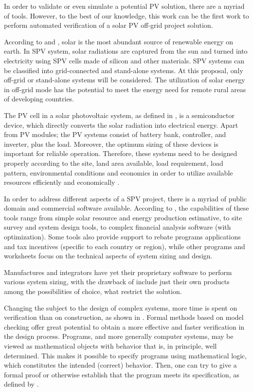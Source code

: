 \documentclass[journal]{IEEEtran}
\begin{document}
In order to validate or even simulate a potential PV solution, there are a myriad of tools. However, to the best of our knowledge, this work can be the first work to perform automated verification of a solar PV off-grid project solution.  

According to \cite{SEIA} and \cite{Chauhan}, solar is the most abundant source of renewable energy on earth. In SPV system, solar radiations are captured from the sun and turned into electricity using SPV cells made of silicon and other materials. SPV systems can be classified into grid-connected and stand-alone systems. At this proposal, only off-grid or stand-alone systems will be considered. The utilization of solar energy in off-grid mode has the potential to meet the energy need for remote rural areas of developing countries.  

The PV cell in a solar photovoltaic system, as defined in \cite{Rawat}, is a semiconductor device, which directly converts the solar radiation into electrical energy. Apart from PV modules; the PV systems consist of battery bank, controller, and inverter, plus the load. Moreover, the optimum sizing of these devices is important for reliable operation. Therefore, these systems need to be designed properly according to the site, land area available, load requirement, load pattern, environmental conditions and economics in order to utilize available resources efficiently and economically \cite{Rawat}. 
 
In order to address different aspects of a SPV project, there is a myriad of public domain and commercial software available. According to \cite{Brooks}, the capabilities of these tools range from simple solar resource and energy production estimative, to site survey and system design tools, to complex financial analysis software (with optimization). Some tools also provide support to rebate programs applications and tax incentives (specific to each country or region), while other programs and worksheets focus on the technical aspects of system sizing and design.  

Manufactures and integrators have yet their proprietary software to perform various system sizing, with the drawback of include just their own products among the possibilities of choice, what restrict the solution. 

Changing the subject to the design of complex systems, more time is spent on verification than on construction, as shown in \cite{Baier}. Formal methods based on model checking offer great potential to obtain a more effective and faster verification in the design process. Programs, and more generally computer systems, may be viewed as mathematical objects with behavior that is, in principle, well determined. This makes it possible to specify programs using mathematical logic, which constitutes the intended (correct) behavior. Then, one can try to give a formal proof or otherwise establish that the program meets its specification, as defined by \cite{Trindade}. 
\end{document}
